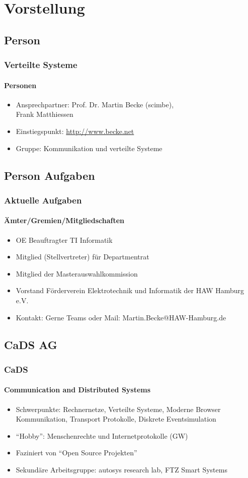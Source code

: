 \section{Vorstellung}
\subsection{Person}
\begin{frame}
  \frametitle{Verteilte Systeme}
  \framesubtitle{Personen}
  \begin{itemize}
    \item Ansprechpartner: Prof. Dr. Martin Becke (scimbe),\\ Frank Matthiessen
    \item Einstiegspunkt: \url{http://www.becke.net}
    \item Gruppe: Kommunikation und verteilte Systeme
  \end{itemize}
\end{frame}


\subsection{Person Aufgaben}
\begin{frame}
  \frametitle{Aktuelle Aufgaben}
  \framesubtitle{Ämter/Gremien/Mitgliedschaften }
  \begin{itemize}
    \item OE Beauftragter TI Informatik 
    \item Mitglied (Stellvertreter) für Departmentrat 
    \item Mitglied der Masterauswahlkommission
    \item Vorstand Förderverein Elektrotechnik und Informatik der HAW Hamburg e.V.
    \item Kontakt: Gerne Teams oder Mail: Martin.Becke@HAW-Hamburg.de
  \end{itemize}
\end{frame}

\subsection{CaDS AG}
\begin{frame}
  \frametitle{CaDS}
  \framesubtitle{Communication and Distributed Systems }
  \begin{itemize}
    \item Schwerpunkte: Rechnernetze, Verteilte Systeme, Moderne Browser Kommunikation, Transport Protokolle, Diskrete Eventsimulation 
    \item \enquote{Hobby}: Menschenrechte und Internetprotokolle (GW)
    \item Faziniert von \enquote{Open Source Projekten}
    \item Sekundäre Arbeitsgruppe: autosys research lab, FTZ Smart Systems
  \end{itemize}
\end{frame}


